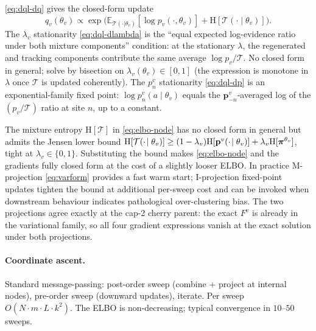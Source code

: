 \eqref{eq:dql-dq} gives the closed-form update
\begin{equation}
  q_v(\theta_v) \propto \exp\!\big(\mathbb{E}_{\mathcal{T}(\cdot|\theta_v)}[\log p_v(\cdot,\theta_v)] + \mathrm{H}[\mathcal{T}(\cdot\!\mid\theta_v)]\big).
  \label{eq:q-update}
\end{equation}
The $\lambda_v$ stationarity \eqref{eq:dql-dlambda} is the
``equal expected log-evidence ratio under both mixture components''
condition: at the stationary $\lambda$, the regenerated and
tracking components contribute the same average $\log p_v/\mathcal{T}$.
No closed form in general; solve by bisection on
$\lambda_v(\theta_v)\in[0,1]$ (the expression is monotone in
$\lambda$ once $\mathcal{T}$ is updated coherently). The $p_n^v$
stationarity \eqref{eq:dql-dp} is an exponential-family fixed
point: $\log p_n^v(a\!\mid\theta_v)$ equals the
$\mathbf{p}_{-n}^v$-averaged log of the $(p_v/\mathcal{T})$ ratio
at site $n$, up to a constant.

The mixture entropy $\mathrm{H}[\mathcal{T}]$ in
\eqref{eq:elbo-node} has no closed form in general but admits the
Jensen lower bound
$\mathrm{H}[\mathcal{T}(\cdot\!\mid\theta_v)] \geq (1-\lambda_v)\mathrm{H}[\mathbf{p}^v(\cdot\!\mid\theta_v)] + \lambda_v\mathrm{H}[\boldsymbol{\pi}^{\theta_v}]$,
tight at $\lambda_v\in\{0,1\}$. Substituting the bound makes
\eqref{eq:elbo-node} and the gradients fully closed form at the
cost of a slightly looser ELBO. In practice M-projection
\eqref{eq:varform} provides a fast warm start; I-projection
fixed-point updates tighten the bound at additional per-sweep cost
and can be invoked when downstream behaviour indicates pathological
over-clustering bias. The two projections agree exactly at the
cap-2 cherry parent: the exact $F^v$ is already in the variational
family, so all four gradient expressions vanish at the exact
solution under both projections.

\paragraph{Coordinate ascent.} Standard message-passing: post-order
sweep (combine $+$ project at internal nodes), pre-order sweep
(downward updates), iterate. Per sweep $O(N\cdot m\cdot L\cdot k^2)$.
The ELBO is non-decreasing; typical convergence in $10$--$50$
sweeps.

